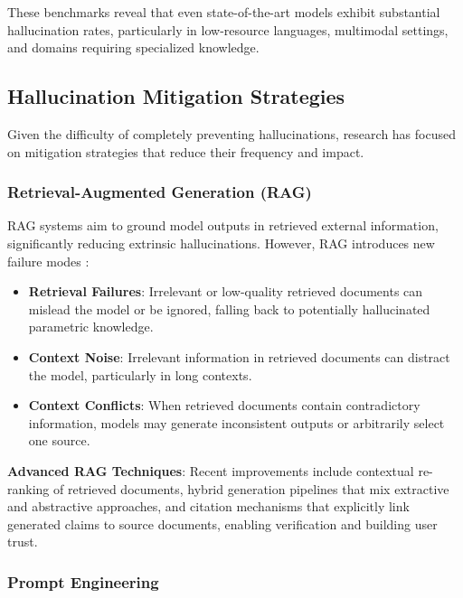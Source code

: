 These benchmarks reveal that even state-of-the-art models exhibit substantial hallucination rates, particularly in low-resource languages, multimodal settings, and domains requiring specialized knowledge.

\subsection{Hallucination Mitigation Strategies}

Given the difficulty of completely preventing hallucinations, research has focused on mitigation strategies that reduce their frequency and impact.

\subsubsection{Retrieval-Augmented Generation (RAG)}

RAG systems \citep{lewis2020rag} aim to ground model outputs in retrieved external information, significantly reducing extrinsic hallucinations. However, RAG introduces new failure modes \citep{mdpi2025rag}:

\begin{itemize}
    \item \textbf{Retrieval Failures}: Irrelevant or low-quality retrieved documents can mislead the model or be ignored, falling back to potentially hallucinated parametric knowledge.
    
    \item \textbf{Context Noise}: Irrelevant information in retrieved documents can distract the model, particularly in long contexts.
    
    \item \textbf{Context Conflicts}: When retrieved documents contain contradictory information, models may generate inconsistent outputs or arbitrarily select one source.
\end{itemize}

\textbf{Advanced RAG Techniques}: Recent improvements include contextual re-ranking of retrieved documents, hybrid generation pipelines that mix extractive and abstractive approaches, and citation mechanisms that explicitly link generated claims to source documents, enabling verification and building user trust.

\subsubsection{Prompt Engineering}

